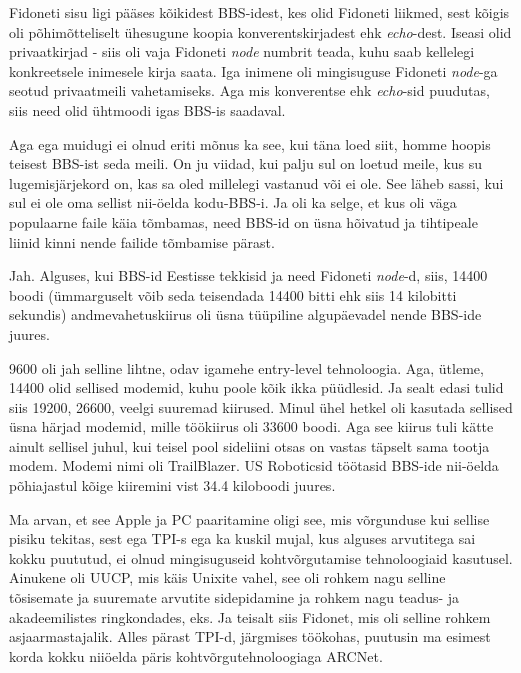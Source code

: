 Fidoneti sisu ligi pääses kõikidest BBS-idest, kes olid Fidoneti liikmed, sest 
kõigis oli põhimõtteliselt ühesugune koopia konverentskirjadest ehk \emph{echo}-dest. 
Iseasi olid privaatkirjad - siis oli  vaja Fidoneti \emph{node} numbrit teada, 
kuhu saab kellelegi konkreetsele inimesele kirja saata. Iga inimene oli  mingisuguse 
Fidoneti \emph{node}-ga seotud   privaatmeili vahetamiseks. Aga mis konverentse 
ehk \emph{echo}-sid puudutas,  siis need  olid ühtmoodi igas BBS-is  saadaval.

Aga ega muidugi ei olnud eriti mõnus ka see, kui täna loed siit, homme  hoopis 
teisest BBS-ist seda meili. On ju viidad, kui palju sul on loetud meile, kus 
su lugemisjärjekord on, kas sa oled millelegi vastanud või ei ole. See  läheb 
sassi, kui sul ei ole oma sellist nii-öelda kodu-BBS-i. Ja oli ka selge, et kus 
oli väga populaarne faile käia tõmbamas,  need BBS-id on  üsna hõivatud ja 
tihtipeale liinid kinni nende failide tõmbamise pärast. 


Jah. Alguses, kui BBS-id Eestisse tekkisid ja need Fidoneti \emph{node}-d, 
siis, 14400 boodi (ümmarguselt võib seda teisendada 14400 
bitti ehk siis 14 kilobitti sekundis) andmevahetuskiirus oli üsna tüüpiline  
algupäevadel nende BBS-ide juures.


9600 oli jah selline lihtne, odav igamehe entry-level tehnoloogia. Aga, ütleme, 14400 olid 
sellised modemid, kuhu poole kõik ikka püüdlesid. Ja sealt edasi tulid siis 
19200, 26600, veelgi suuremad kiirused. Minul ühel hetkel oli kasutada sellised 
üsna  härjad modemid, mille töökiirus oli 33600 boodi. Aga see kiirus tuli 
kätte ainult sellisel juhul, kui teisel pool sideliini otsas on vastas täpselt 
sama tootja modem. Modemi  nimi oli TrailBlazer. US Roboticsid  töötasid BBS-ide 
nii-öelda  põhiajastul kõige kiiremini vist 34.4 kiloboodi juures.


Ma arvan, et see Apple ja PC paaritamine oligi see, mis  võrgunduse kui sellise 
pisiku tekitas, sest ega TPI-s ega ka kuskil mujal, kus alguses arvutitega sai kokku 
puututud, ei olnud mingisuguseid kohtvõrgutamise tehnoloogiaid 
kasutusel. Ainukene oli UUCP, mis käis Unixite vahel, see oli rohkem nagu 
selline tõsisemate ja suuremate arvutite sidepidamine  ja rohkem nagu teadus- 
ja akadeemilistes ringkondades, eks. Ja teisalt siis Fidonet, mis oli selline 
rohkem asjaarmastajalik. Alles pärast TPI-d, järgmises töökohas, puutusin ma esimest 
korda kokku niiöelda päris kohtvõrgutehnoloogiaga ARCNet.

